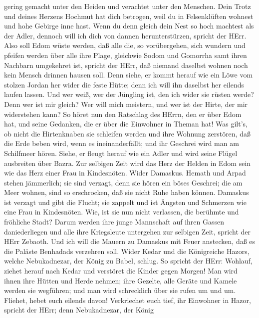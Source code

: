 gering gemacht unter den Heiden und verachtet unter den Menschen.
 Dein Trotz und deines Herzens Hochmut hat dich betrogen,
weil du in Felsenklüften wohnest und hohe Gebirge inne hast. Wenn du
denn gleich dein Nest so hoch machtest als der Adler, dennoch will ich
dich von dannen herunterstürzen, spricht der HErr.  Also
soll Edom wüste werden, daß alle die, so vorübergehen, sich wundern und
pfeifen werden über alle ihre Plage,  gleichwie Sodom und
Gomorrha samt ihren Nachbarn umgekehret ist, spricht der HErr, daß
niemand daselbst wohnen noch kein Mensch drinnen hausen soll.
 Denn siehe, er kommt herauf wie ein Löwe vom stolzen
Jordan her wider die feste Hütte; denn ich will ihn daselbst her eilends
laufen lassen. Und wer weiß, wer der Jüngling ist, den ich wider sie
rüsten werde? Denn wer ist mir gleich? Wer will mich meistern, und wer
ist der Hirte, der mir widerstehen kann?  So höret nun den
Ratschlag des HErrn, den er über Edom hat, und seine Gedanken, die er
über die Einwohner in Theman hat! Was gilt's, ob nicht die Hirtenknaben
sie schleifen werden und ihre Wohnung zerstören,  daß die
Erde beben wird, wenn es ineinanderfällt; und ihr Geschrei wird man am
Schilfmeer hören.  Siehe, er fleugt herauf wie ein Adler
und wird seine Flügel ausbreiten über Bazra. Zur selbigen Zeit wird das
Herz der Helden in Edom sein wie das Herz einer Frau in Kindesnöten.
 Wider Damaskus. Hemath und Arpad stehen jämmerlich; sie
sind verzagt, denn sie hören ein böses Geschrei; die am Meer wohnen,
sind so erschrocken, daß sie nicht Ruhe haben können. 
Damaskus ist verzagt und gibt die Flucht; sie zappelt und ist Ängsten
und Schmerzen wie eine Frau in Kindesnöten.  Wie, ist sie
nun nicht verlassen, die berühmte und fröhliche Stadt? 
Darum werden ihre junge Mannschaft auf ihren Gassen daniederliegen und
alle ihre Kriegsleute untergehen zur selbigen Zeit, spricht der HErr
Zebaoth.  Und ich will die Mauern zu Damaskus mit Feuer
anstecken, daß es die Paläste Benhadads verzehren soll. 
Wider Kedar und die Königreiche Hazors, welche Nebukadnezar, der König
zu Babel, schlug. So spricht der HErr: Wohlauf, ziehet herauf nach Kedar
und verstöret die Kinder gegen Morgen!  Man wird ihnen ihre
Hütten und Herde nehmen; ihre Gezelte, alle Geräte und Kamele werden sie
wegführen; und man wird schrecklich über sie rufen um und um.
 Fliehet, hebet euch eilends davon! Verkriechet euch tief,
ihr Einwohner in Hazor, spricht der HErr; denn Nebukadnezar, der König
